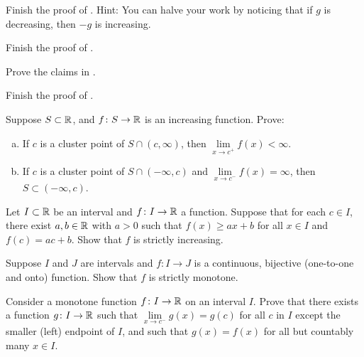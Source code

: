 \begin{exercise}
Finish the proof of .
Hint: You can halve your work by noticing that if $g$ is decreasing,
then $-g$ is increasing.
\end{exercise}

\begin{exercise}
Finish the proof of .
\end{exercise}

\begin{exercise}
Prove the claims in .
\end{exercise}

\begin{exercise}
Finish the proof of .
\end{exercise}

\begin{samepage}
\begin{exercise}
Suppose $S \subset {\mathbb{R}}$, and $f \colon S \to {\mathbb{R}}$ is an increasing
function.  Prove:
\begin{enumerate}[a)]
\item
If $c$ is a cluster point
of $S \cap (c,\infty)$, then
$\lim\limits_{x\to c^+} f(x) < \infty$.
\item
If $c$ is a cluster point of $S \cap (-\infty,c)$
and $\lim\limits_{x\to c^-} f(x) = \infty$, then
$S \subset (-\infty,c)$.
\end{enumerate}
\end{exercise}
\end{samepage}

\begin{exercise}
Let $I \subset {\mathbb{R}}$ be an interval and $f \colon I \to {\mathbb{R}}$ a function.
Suppose that for each $c \in I$, there exist $a, b \in {\mathbb{R}}$ with
$a > 0$ such that $f(x) \geq a x + b$ for all $x \in I$
and $f(c) = a c + b$.  Show that $f$ is strictly increasing.
\end{exercise}

\begin{exercise}
Suppose $I$ and $J$ are intervals and
$f \colon I \to J$ is a continuous, bijective (one-to-one and onto)
function.  Show that $f$ is strictly monotone.
\end{exercise}

\begin{exercise}
Consider a monotone function $f \colon I \to {\mathbb{R}}$ on an interval $I$.  Prove that there exists
a function $g \colon I \to {\mathbb{R}}$ such that
$\lim\limits_{x \to c^-} g(x) = g(c)$ for all $c$ in $I$ except the
smaller (left) endpoint of $I$, and such that
$g(x) = f(x)$ for all but countably many $x \in I$.
\end{exercise}

